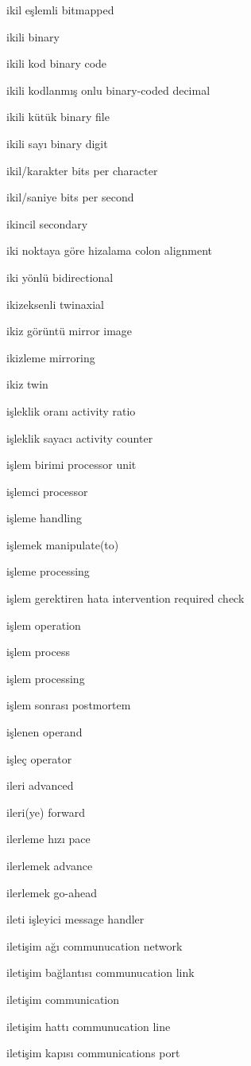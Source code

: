 \documentclass[12pt,fleqn]{article}\usepackage{../../common}
\begin{document}
ikil eşlemli bitmapped

ikili binary

ikili kod binary code

ikili kodlanmış onlu binary-coded decimal

ikili kütük binary file

ikili sayı binary digit

ikil/karakter bits per character

ikil/saniye bits per second

ikincil secondary

iki noktaya göre hizalama colon alignment

iki yönlü bidirectional

ikizeksenli twinaxial

ikiz görüntü mirror image

ikizleme mirroring

ikiz twin

işleklik oranı activity ratio

işleklik sayacı activity counter

işlem birimi processor unit

işlemci processor

işleme handling

işlemek manipulate(to)

işleme processing

işlem gerektiren hata intervention required check

işlem operation

işlem process

işlem processing

işlem sonrası postmortem

işlenen operand

işleç operator

ileri advanced

ileri(ye) forward

ilerleme hızı pace

ilerlemek advance

ilerlemek go-ahead

ileti işleyici message handler

iletişim ağı communucation network

iletişim bağlantısı communucation link

iletişim communication

iletişim hattı communucation line

iletişim kapısı communications port
\end{document}
